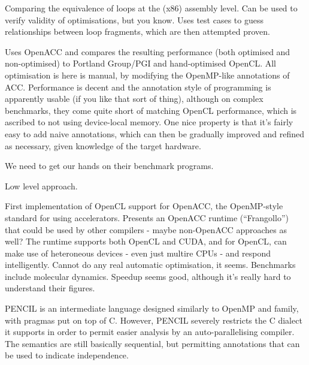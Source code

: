 \documentclass[a4paper, oneside, final]{memoir}
\begin{document}
Comparing the equivalence of loops at the (x86) assembly level.  Can
be used to verify validity of optimisations, but you know.  Uses test
cases to guess relationships between loop fragments, which are then
attempted proven.

\begin{quote}
\end{quote}

Uses OpenACC and compares the resulting performance (both optimised
and non-optimised) to Portland Group/PGI and hand-optimised OpenCL.
All optimisation is here is manual, by modifying the OpenMP-like
annotations of ACC.  Performance is decent and the annotation style of
programming is apparently usable (if you like that sort of thing),
although on complex benchmarks, they come quite short of matching
OpenCL performance, which is ascribed to not using device-local
memory.  One nice property is that it's fairly easy to add naive
annotations, which can then be gradually improved and refined as
necessary, given knowledge of the target hardware.

We need to get our hands on their benchmark programs.

Low level approach.

\begin{quote}
\end{quote}

First implementation of OpenCL support for OpenACC, the OpenMP-style
standard for using accelerators.  Presents an OpenACC runtime
(``Frangollo'') that could be used by other compilers - maybe
non-OpenACC approaches as well?  The runtime supports both OpenCL and
CUDA, and for OpenCL, can make use of heteroneous devices - even just
multire CPUs - and respond intelligently.  Cannot do any real
automatic optimisation, it seems.  Benchmarks include molecular
dynamics.  Speedup seems good, although it's really hard to understand
their figures.

\begin{quote}
\end{quote}

\begin{quote}
\end{quote}

PENCIL is an intermediate language designed similarly to OpenMP and
family, with pragmas put on top of C.  However, PENCIL severely
restricts the C dialect it supports in order to permit easier analysis
by an auto-parallelising compiler.  The semantics are still basically
sequential, but permitting annotations that can be used to indicate
independence.
\end{document}
